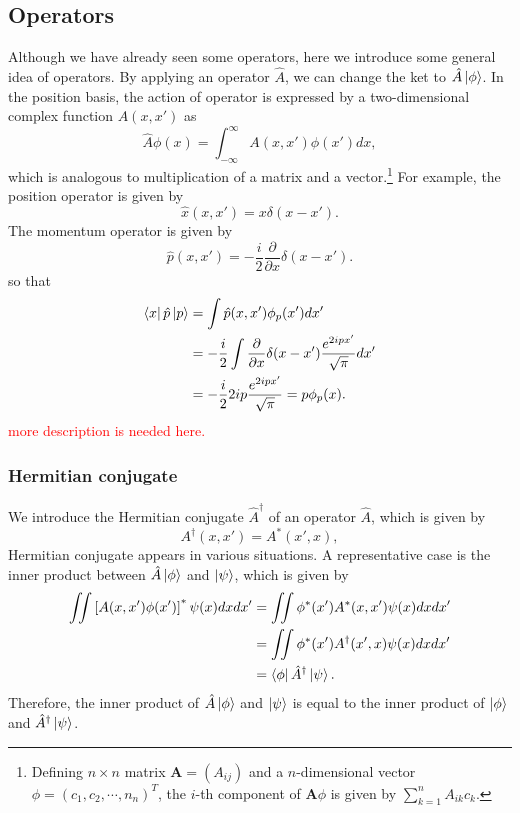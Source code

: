 \subsection{Operators}
Although we have already seen some operators, here we introduce some general idea of operators. By applying an operator $\hat A$, we can change the ket to $\hat A \ket \phi$. In the position basis,  the action of operator is expressed by a two-dimensional complex function $A(x,x')$ as
\begin{equation}
  \hat A\phi(x) = \int_{-\infty}^{\infty}A(x,x')\phi(x')dx,
\end{equation}
which is analogous to multiplication of a matrix and a vector.\footnote{Defining $n \times n$ matrix $\mathbf A = (A_{ij})$ and a $n$-dimensional vector $\phi = (c_1, c_2,\cdots, n_n )^T$, the $i$-th component of $\mathbf A \phi$ is given by $\sum_{k=1}^{n}A_{ik}c_k$.} For example, the position operator is given by
\begin{equation}
  \hat x(x,x') = x\delta(x-x').
\end{equation}
The momentum operator is given by
\begin{equation}
  \hat p(x,x') = -\frac{i}{2}\frac{\partial}{\partial x}\delta(x-x').
\end{equation}
so that 
\begin{equation}
\begin{aligned}	
  \bra x\hat p\ket p &= \int \hat p(x,x')\phi_p(x')dx' \\
  &= -\frac i 2 \int \frac{\partial}{\partial x}\delta(x-x')\frac{e^{2ipx'}}{\sqrt \pi}dx' \\
  &= -\frac i 2 2ip\frac{e^{2ipx'}}{\sqrt \pi} = p\phi_p(x).
\end{aligned}
\end{equation}
\textcolor{red}{more description is needed here.}

\subsubsection{Hermitian conjugate}
We introduce the Hermitian conjugate $\hat A^\dagger$ of an operator $\hat A$, which is given by
\begin{equation}
  A^\dagger(x,x') = A^*(x',x),
\end{equation}
Hermitian conjugate appears in various situations. A representative case is the inner product between $\hat A\ket \phi$ and $\ket \psi$, which is given by
\begin{equation}
\begin{aligned}
	  \iint\left[A(x,x')\phi(x')\right]^*\psi(x)dxdx' &= \iint \phi^*(x')A^*(x,x')\psi(x)dxdx' \\
	  &= \iint \phi^*(x')A^\dagger(x',x)\psi(x)dxdx'\\
	  &= \bra \phi \hat A^\dagger \ket \psi.
\end{aligned}
\end{equation}
Therefore, the inner product of $\hat A \ket \phi$ and $\ket \psi$ is equal to the inner product of $\ket \phi$ and $\hat A^\dagger \ket \psi$.


